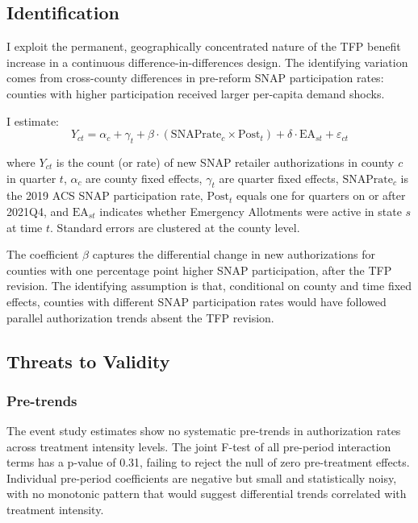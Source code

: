 \documentclass[12pt]{article}
\begin{document}
\subsection{Identification}

I exploit the permanent, geographically concentrated nature of the TFP benefit increase in a continuous difference-in-differences design. The identifying variation comes from cross-county differences in pre-reform SNAP participation rates: counties with higher participation received larger per-capita demand shocks.

I estimate:
\begin{equation}
Y_{ct} = \alpha_c + \gamma_t + \beta \cdot (\text{SNAPrate}_c \times \text{Post}_t) + \delta \cdot \text{EA}_{st} + \varepsilon_{ct}
\label{eq:main}
\end{equation}

\noindent where $Y_{ct}$ is the count (or rate) of new SNAP retailer authorizations in county $c$ in quarter $t$, $\alpha_c$ are county fixed effects, $\gamma_t$ are quarter fixed effects, $\text{SNAPrate}_c$ is the 2019 ACS SNAP participation rate, $\text{Post}_t$ equals one for quarters on or after 2021Q4, and $\text{EA}_{st}$ indicates whether Emergency Allotments were active in state $s$ at time $t$. Standard errors are clustered at the county level.

The coefficient $\beta$ captures the differential change in new authorizations for counties with one percentage point higher SNAP participation, after the TFP revision. The identifying assumption is that, conditional on county and time fixed effects, counties with different SNAP participation rates would have followed parallel authorization trends absent the TFP revision.

\subsection{Threats to Validity}

\subsubsection*{Pre-trends}
The event study estimates show no systematic pre-trends in authorization rates across treatment intensity levels. The joint F-test of all pre-period interaction terms has a p-value of 0.31, failing to reject the null of zero pre-treatment effects. Individual pre-period coefficients are negative but small and statistically noisy, with no monotonic pattern that would suggest differential trends correlated with treatment intensity.
\end{document}
